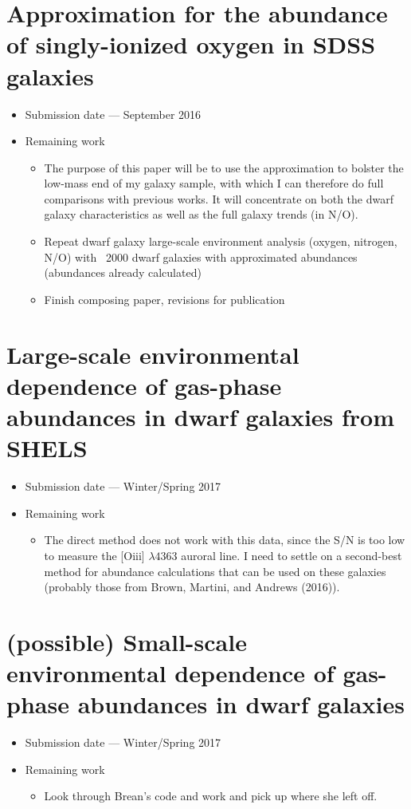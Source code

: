 \documentclass{article}
\begin{document}
\section{Approximation for the abundance of singly-ionized oxygen in SDSS galaxies}
\begin{itemize}
    \item Submission date --- September 2016
    \item Remaining work
    \begin{itemize}
        \item The purpose of this paper will be to use the approximation to bolster the low-mass end of my galaxy sample, with which I can therefore do full comparisons with previous works.  It will concentrate on both the dwarf galaxy characteristics as well as the full galaxy trends (in N/O).  
        \item Repeat dwarf galaxy large-scale environment analysis (oxygen, nitrogen, N/O) with ~2000 dwarf galaxies with approximated abundances (abundances already calculated)
        \item Finish composing paper, revisions for publication
    \end{itemize}
\end{itemize}

\section{Large-scale environmental dependence of gas-phase abundances in dwarf galaxies from SHELS}
\begin{itemize}
    \item Submission date --- Winter/Spring 2017
    \item Remaining work
    \begin{itemize}
        \item The direct method does not work with this data, since the S/N is too low to measure the [O{\sc iii}] $\lambda 4363$ auroral line.  I need to settle on a second-best method for abundance calculations that can be used on these galaxies (probably those from Brown, Martini, and Andrews (2016)).
    \end{itemize}
\end{itemize}

\section{(possible) Small-scale environmental dependence of gas-phase abundances in dwarf galaxies}
\begin{itemize}
    \item Submission date --- Winter/Spring 2017
    \item Remaining work
    \begin{itemize}
        \item Look through Brean's code and work and pick up where she left off.
    \end{itemize}
\end{itemize}
\end{document}
